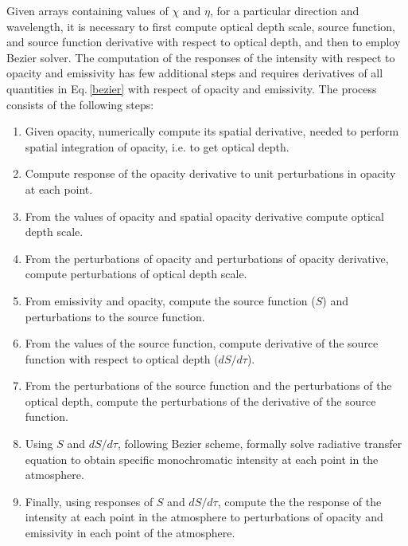 \documentclass[referee]{aa}
\begin{document}
Given arrays containing values of $\chi$ and $\eta$, for a particular direction and wavelength, it is necessary to first compute optical depth scale, source function, and source function derivative with respect to optical depth, and then to employ Bezier solver. The computation of the responses of the intensity with respect to opacity and emissivity has few additional steps and requires derivatives of all quantities in Eq.\,\ref{bezier} with respect of opacity and emissivity. The process consists of the following steps:
\begin{enumerate}
 \item Given opacity, numerically compute its spatial derivative, needed to perform spatial integration of opacity, i.e. to get optical depth.
 \item Compute response of the opacity derivative to unit perturbations in opacity at each point.
 \item From the values of opacity and spatial opacity derivative compute optical depth scale. 
 \item From the perturbations of opacity and perturbations of opacity derivative, compute perturbations of optical depth scale. 
 \item From emissivity and opacity, compute the source function ($S$) and perturbations to the source function.
 \item From the values of the source function, compute derivative of the source function with respect to optical depth ($dS/d\tau$).
 \item From the perturbations of the source function and the perturbations of the optical depth, compute the perturbations of the derivative of the source function.
 \item Using $S$ and $dS/d\tau$, following Bezier scheme, formally solve radiative transfer equation to obtain specific monochromatic intensity at each point in the atmosphere.
 \item Finally, using responses of $S$ and $dS/d\tau$, compute the the response of the intensity at each point in the atmosphere to perturbations of opacity and emissivity in each point of the atmosphere. 
\end{enumerate}
\end{document}
